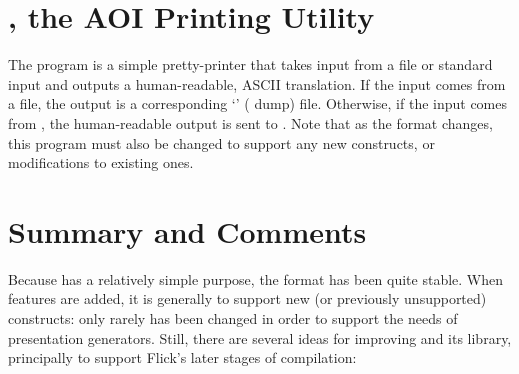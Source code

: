 

\section{\aoid{}, the AOI Printing Utility}
\label{sec:AOI:aoid, the AOI Printing Utility}

The \aoid{} program is a simple pretty-printer that takes \AOI{} input from a
file or standard input and outputs a human-readable, ASCII translation.  If the
\AOI{} input comes from a file, the output is a corresponding `'
(\AOI{} dump) file.  Otherwise, if the \AOI{} input comes from
, the human-readable output is sent to .
Note that as the \AOI{} format changes, this program must also be changed to
support any new constructs, or modifications to existing ones.



\section{Summary and Comments}
\label{sec:AOI:Summary and Comments}

Because \AOI{} has a relatively simple purpose, the \AOI{} format has been
quite stable.  When features are added, it is generally to support new (or
previously unsupported) \IDL{} constructs: only rarely has \AOI{} been changed
in order to support the needs of presentation generators.  Still, there are
several ideas for improving \AOI{} and its library, principally to support
Flick's later stages of compilation:

